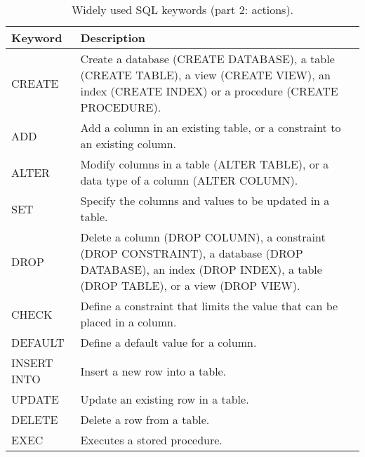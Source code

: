 \begin{table}
	\centering \caption{Widely used SQL keywords (part 2: actions).}\label{ch:db:tab:sqlkeywords2}
	\begin{tabularx}{\textwidth}{lX}
		\hline
		Keyword & Description \\ \hline
		CREATE & Create a database (CREATE DATABASE), a table (CREATE TABLE), a view (CREATE VIEW), an index (CREATE INDEX) or a procedure (CREATE PROCEDURE). \\ \hdashline
		ADD & Add a column in an existing table, or a constraint to an existing column. \\ \hdashline
		ALTER & Modify columns in a table (ALTER TABLE), or a data type of a column (ALTER COLUMN). \\ \hdashline
		SET & Specify the columns and values to be updated in a table. \\ \hdashline
		DROP & Delete a column (DROP COLUMN), a constraint (DROP CONSTRAINT), a database (DROP DATABASE), an index (DROP INDEX), a table (DROP TABLE), or a view (DROP VIEW). \\ \hdashline
		CHECK & Define a constraint that limits the value that can be placed in a column. \\ \hdashline
		DEFAULT & Define a default value for a column. \\ \hdashline
		INSERT INTO & Insert a new row into a table. \\ \hdashline
		UPDATE & Update an existing row in a table. \\ \hdashline
		DELETE & Delete a row from a table. \\ \hdashline
		EXEC & Executes a stored procedure. \\ \hline
	\end{tabularx}
\end{table}

